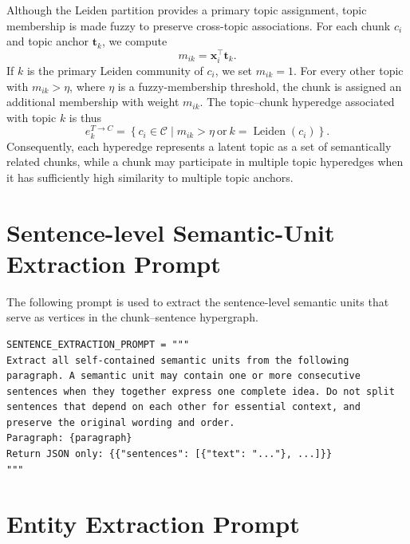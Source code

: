 \documentclass{article} %
\begin{document}
Although the Leiden partition provides a primary topic assignment, topic membership is made fuzzy to preserve cross-topic associations. For each chunk $c_i$ and topic anchor $\mathbf{t}_k$, we compute
\begin{equation}
m_{ik}=\mathbf{x}_i^{\top}\mathbf{t}_k.
\end{equation}
If $k$ is the primary Leiden community of $c_i$, we set $m_{ik}=1$. For every other topic with $m_{ik}>\eta$, where $\eta$ is a fuzzy-membership threshold, the chunk is assigned an additional membership with weight $m_{ik}$. The topic--chunk hyperedge associated with topic $k$ is thus
\begin{equation}
e_k^{T\rightarrow C}=\left\{c_i\in\mathcal{C}\mid m_{ik}>\eta\ \text{or}\ k=\operatorname{Leiden}(c_i)\right\}.
\end{equation}
Consequently, each hyperedge represents a latent topic as a set of semantically related chunks, while a chunk may participate in multiple topic hyperedges when it has sufficiently high similarity to multiple topic anchors.

\section{Sentence-level Semantic-Unit Extraction Prompt}
\label{app:sentence_extraction_prompt}

The following prompt is used to extract the sentence-level semantic units that serve as vertices in the chunk--sentence hypergraph.
\begin{lstlisting}
SENTENCE_EXTRACTION_PROMPT = """
Extract all self-contained semantic units from the following paragraph. A semantic unit may contain one or more consecutive sentences when they together express one complete idea. Do not split sentences that depend on each other for essential context, and preserve the original wording and order.
Paragraph: {paragraph}
Return JSON only: {{"sentences": [{"text": "..."}, ...]}}
"""
\end{lstlisting}

\section{Entity Extraction Prompt}
\label{app:entity_extraction_prompt}
\end{document}
